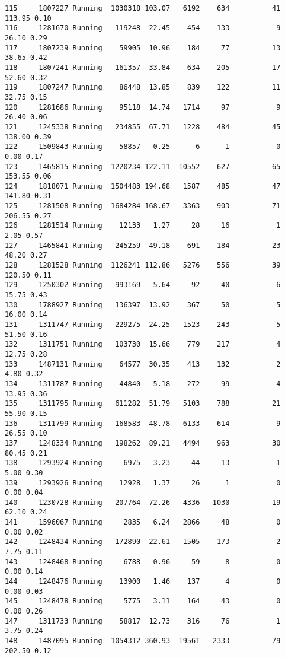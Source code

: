 \documentclass[
]{article}
\begin{document}
\begin{verbatim}
115     1807227 Running  1030318 103.07   6192    634          41  113.95 0.10
116     1281670 Running   119248  22.45    454    133           9   26.10 0.29
117     1807239 Running    59905  10.96    184     77          13   38.65 0.42
118     1807241 Running   161357  33.84    634    205          17   52.60 0.32
119     1807247 Running    86448  13.85    839    122          11   32.75 0.15
120     1281686 Running    95118  14.74   1714     97           9   26.40 0.06
121     1245338 Running   234855  67.71   1228    484          45  138.00 0.39
122     1509843 Running    58857   0.25      6      1           0    0.00 0.17
123     1465815 Running  1220234 122.11  10552    627          65  153.55 0.06
124     1818071 Running  1504483 194.68   1587    485          47  141.80 0.31
125     1281508 Running  1684284 168.67   3363    903          71  206.55 0.27
126     1281514 Running    12133   1.27     28     16           1    2.05 0.57
127     1465841 Running   245259  49.18    691    184          23   48.20 0.27
128     1281528 Running  1126241 112.86   5276    556          39  120.50 0.11
129     1250302 Running   993169   5.64     92     40           6   15.75 0.43
130     1788927 Running   136397  13.92    367     50           5   16.00 0.14
131     1311747 Running   229275  24.25   1523    243           5   51.50 0.16
132     1311751 Running   103730  15.66    779    217           4   12.75 0.28
133     1487131 Running    64577  30.35    413    132           2    4.80 0.32
134     1311787 Running    44840   5.18    272     99           4   13.95 0.36
135     1311795 Running   611282  51.79   5103    788          21   55.90 0.15
136     1311799 Running   168583  48.78   6133    614           9   26.55 0.10
137     1248334 Running   198262  89.21   4494    963          30   80.45 0.21
138     1293924 Running     6975   3.23     44     13           1    5.00 0.30
139     1293926 Running    12928   1.37     26      1           0    0.00 0.04
140     1230728 Running   207764  72.26   4336   1030          19   62.10 0.24
141     1596067 Running     2835   6.24   2866     48           0    0.00 0.02
142     1248434 Running   172890  22.61   1505    173           2    7.75 0.11
143     1248468 Running     6788   0.96     59      8           0    0.00 0.14
144     1248476 Running    13900   1.46    137      4           0    0.00 0.03
145     1248478 Running     5775   3.11    164     43           0    0.00 0.26
147     1311733 Running    58817  12.73    316     76           1    3.75 0.24
148     1487095 Running  1054312 360.93  19561   2333          79  202.50 0.12

\end{verbatim}
\end{document}
